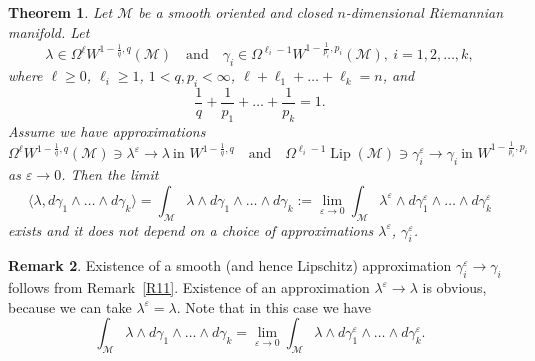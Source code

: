 \documentclass[intlimits,12pt,reqno]{amsart}
\newcommand{\cM}{\mathcal M}
\newcommand{\eps}{\varepsilon}
\numberwithin{equation}{section}
\def\lip{\operatorname{Lip}}
\newtheorem{theorem}{Theorem}[section]
\theoremstyle{definition}
\newtheorem{remark}[theorem]{Remark}
\begin{document}
\begin{theorem}
\label{T32}
Let $\cM$ be a smooth oriented and closed $n$-dimensional Riemannian manifold. Let
$$
\lambda\in \Omega^\ell W^{1-\frac{1}{q},q}(\cM)
\quad
\text{and}
\quad
\gamma_i\in \Omega^{\ell_i-1}W^{1-\frac{1}{p_i},p_i}\left(\cM\right),
\
i=1,2,\ldots,k,
$$
where $\ell\geq 0$, $\ell_i\geq 1$, $1<q,p_i<\infty$,  $\ell+\ell_1+\ldots+\ell_k=n$, and
\begin{equation}
\label{eq24}
\frac{1}{q}+\frac{1}{p_1}+\ldots+\frac{1}{p_{k}}=1.
\end{equation}
Assume we have approximations
$$
\Omega^\ell W^{1-\frac{1}{q},q}\left(\cM\right)\ni\lambda^\eps\to\lambda\ \text{in $W^{1-\frac{1}{q},q}$}
\quad
\text{and}
\quad
\Omega^{\ell_i-1}\lip\left(\cM\right)\ni \gamma_i^\eps\to \gamma_i\ \text{in $W^{1-\frac{1}{p_i},p_i}$}
$$
as $\eps\to 0$. Then the limit
\begin{equation}
\label{eq31}
\langle \lambda,d\gamma_1\wedge\ldots\wedge d\gamma_k\rangle=
\int_{\cM}\lambda\wedge d\gamma_1\wedge\ldots\wedge d\gamma_{k}:=
\lim_{\eps\to 0}\int_{\cM} \lambda^\eps\wedge d\gamma_1^\eps\wedge\ldots\wedge d\gamma_k^\eps
\end{equation}
exists and it does not depend on a choice of approximations $\lambda^\eps$, $\gamma_i^\eps$.
\end{theorem}
\begin{remark}
\label{R10}
Existence of a smooth (and hence Lipschitz) approximation $\gamma_i^\eps\to\gamma_i$ follows from Remark~\ref{R11}. Existence of an approximation $\lambda^\eps\to\lambda$ is obvious, because we can take $\lambda^\eps=\lambda$. Note that in this case we have
$$
\int_{\cM}\lambda\wedge d\gamma_1\wedge\ldots\wedge d\gamma_{k}=
\lim_{\eps\to 0}\int_{\cM} \lambda\wedge d\gamma_1^\eps\wedge\ldots\wedge d\gamma_k^\eps.
$$
\end{remark}
\end{document}
